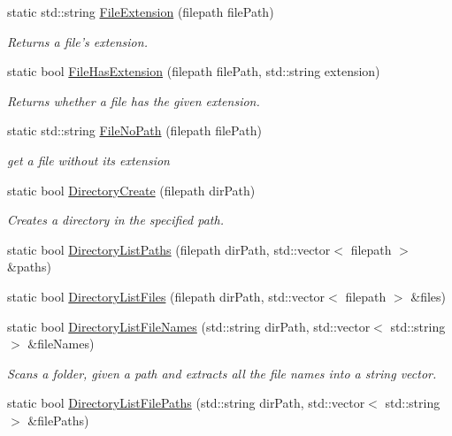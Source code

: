 \begin{DoxyCompactItemize}
static std\-::string \hyperlink{classDCEngine_1_1FileSystem_af257ee220649aa361b08989c1c8bb146}{File\-Extension} (filepath file\-Path)
\begin{DoxyCompactList}\small\item\em Returns a file's extension. \end{DoxyCompactList}\item 
static bool \hyperlink{classDCEngine_1_1FileSystem_a0c5f3fcd6067e5aba46024c59c3d9375}{File\-Has\-Extension} (filepath file\-Path, std\-::string extension)
\begin{DoxyCompactList}\small\item\em Returns whether a file has the given extension. \end{DoxyCompactList}\item 
static std\-::string \hyperlink{classDCEngine_1_1FileSystem_afbdb31b4fa5520bf1c2e71ef465fa67c}{File\-No\-Path} (filepath file\-Path)
\begin{DoxyCompactList}\small\item\em get a file without its extension \end{DoxyCompactList}\item 
static bool \hyperlink{classDCEngine_1_1FileSystem_a0679d28bbf8f0ab25213e0b7b7bd6ef7}{Directory\-Create} (filepath dir\-Path)
\begin{DoxyCompactList}\small\item\em Creates a directory in the specified path. \end{DoxyCompactList}\item 
static bool \hyperlink{classDCEngine_1_1FileSystem_a1d5fb901e937c49a4ef2953b766633ce}{Directory\-List\-Paths} (filepath dir\-Path, std\-::vector$<$ filepath $>$ \&paths)
\item 
static bool \hyperlink{classDCEngine_1_1FileSystem_aa25b2136e3fa62a49a0179829ca1bbd6}{Directory\-List\-Files} (filepath dir\-Path, std\-::vector$<$ filepath $>$ \&files)
\item 
static bool \hyperlink{classDCEngine_1_1FileSystem_a04611e20dc329ba4bc94236f6521cd27}{Directory\-List\-File\-Names} (std\-::string dir\-Path, std\-::vector$<$ std\-::string $>$ \&file\-Names)
\begin{DoxyCompactList}\small\item\em Scans a folder, given a path and extracts all the file names into a string vector. \end{DoxyCompactList}\item 
static bool \hyperlink{classDCEngine_1_1FileSystem_a89725f228de12e219af24267db3d1441}{Directory\-List\-File\-Paths} (std\-::string dir\-Path, std\-::vector$<$ std\-::string $>$ \&file\-Paths)

\end{DoxyCompactItemize}
